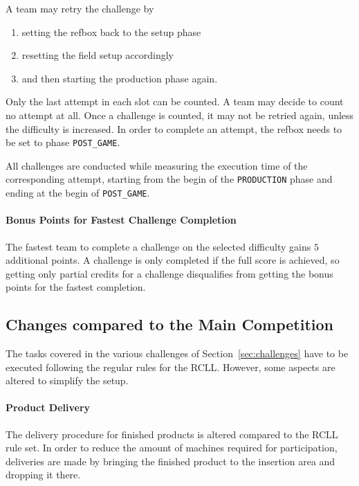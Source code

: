 \documentclass[12pt,twoside]{article}
\newcommand{\refsec}[1]{Section~\ref{#1}}
\begin{document}

A team may retry the challenge by
\begin{enumerate}
	\item setting the \ac{refbox} back to the setup phase
	\item resetting the field setup accordingly
	\item and then starting the production phase again.
\end{enumerate}
Only the last attempt in each slot can be counted. A team may decide to count
no attempt at all. Once a challenge is counted, it
may not be retried again, unless the difficulty is increased.
In order to complete an attempt, the \ac{refbox} needs to be set to phase
\texttt{POST\_GAME}.

All challenges are conducted while measuring the execution time of the
corresponding attempt, starting from the begin of the \texttt{PRODUCTION} phase
and ending at the begin of \texttt{POST\_GAME}.

\paragraph{Bonus Points for Fastest Challenge Completion}
The fastest team to complete a challenge on the selected difficulty gains $5$
additional points. A challenge is only completed if the full score is achieved,
so getting only partial credits for a challenge disqualifies from getting the
bonus points for the fastest completion.

\subsection{Changes compared to the Main Competition}
The tasks covered in the various challenges of \refsec{sec:challenges} have to
be executed following the regular rules for the \ac{RCLL}.
However, some aspects are altered to simplify the setup.

\paragraph{Product Delivery}
The delivery procedure for finished products is altered compared to the
\ac{RCLL} rule set. In order to reduce the amount of machines required
for participation, deliveries are made by bringing the finished product
to the insertion area and dropping it there.
\end{document}
